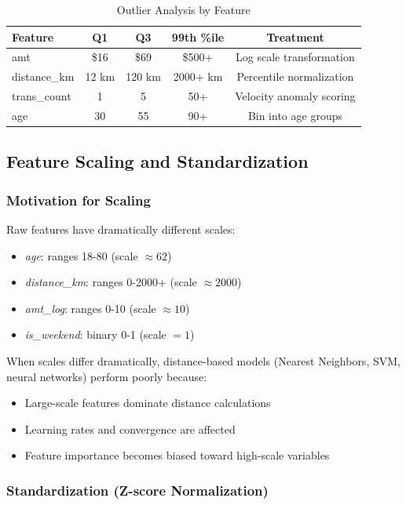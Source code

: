\begin{table}[h]
\centering
\caption{Outlier Analysis by Feature}
\begin{tabular}{|l|c|c|c|c|}
\hline
\textbf{Feature} & \textbf{Q1} & \textbf{Q3} & \textbf{99th \%ile} & \textbf{Treatment} \\
\hline
amt & \$16 & \$69 & \$500+ & Log scale transformation \\
\hline
distance\_km & 12 km & 120 km & 2000+ km & Percentile normalization \\
\hline
trans\_count & 1 & 5 & 50+ & Velocity anomaly scoring \\
\hline
age & 30 & 55 & 90+ & Bin into age groups \\
\hline
\end{tabular}
\end{table}

\subsection{Feature Scaling and Standardization}

\subsubsection{Motivation for Scaling}

Raw features have dramatically different scales:
\begin{itemize}
    \item \textit{age}: ranges 18-80 (scale $\approx 62$)
    \item \textit{distance\_km}: ranges 0-2000+ (scale $\approx 2000$)
    \item \textit{amt\_log}: ranges 0-10 (scale $\approx 10$)
    \item \textit{is\_weekend}: binary 0-1 (scale $= 1$)
\end{itemize}

When scales differ dramatically, distance-based models (Nearest Neighbors, SVM, neural networks) perform poorly because:
\begin{itemize}
    \item Large-scale features dominate distance calculations
    \item Learning rates and convergence are affected
    \item Feature importance becomes biased toward high-scale variables
\end{itemize}

\subsubsection{Standardization (Z-score Normalization)}

